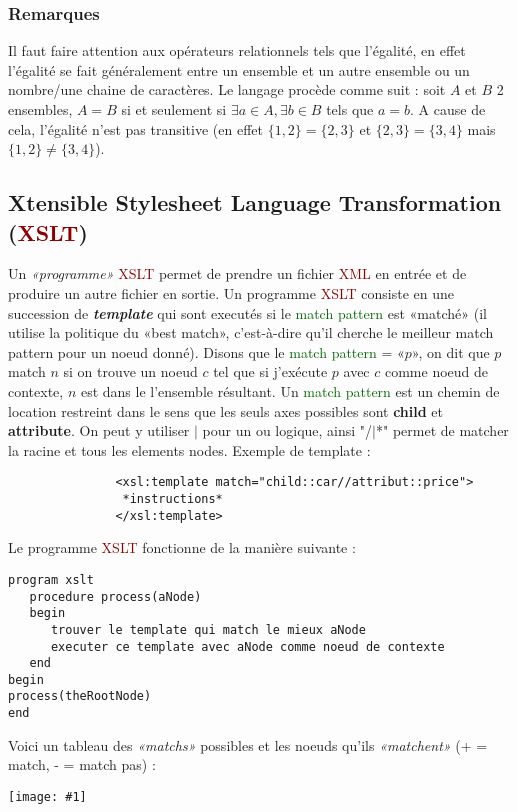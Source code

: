 \documentclass{article}
\newcommand{\gre}[1]{\textcolor{darkgreen}{#1}}
\newcommand{\red}[1]{\textcolor{darkred}{#1}}
\newcommand{\imgR}[2]{\begin{center}\texttt{[image: \#1]}\end{center}}
\begin{document}
\subsubsection{Remarques}

Il faut faire attention aux opérateurs relationnels tels que l'égalité, en effet l'égalité se fait généralement entre un ensemble et un autre ensemble ou un nombre/une chaine de 
caractères. Le langage procède comme suit : soit $A$ et $B$ 2 ensembles, $A = B$ si et seulement si $\exists a \in A, \exists b \in B$ tels que $a = b$. A cause de cela, 
l'égalité n'est pas transitive (en effet $\{1,2\} = \{2,3\}$ et $\{2,3\} = \{3,4\}$ mais $\{1,2\} \not = \{3,4\}$).

\subsection{Xtensible Stylesheet Language Transformation (\red{XSLT})}

Un \textit{«programme»} \red{XSLT} permet de prendre un fichier \red{XML} en entrée et de produire un autre fichier en sortie. Un programme \red{XSLT} consiste en une 
succession de \textit{\textbf{template}} qui sont executés si le \gre{match pattern} est «matché» (il utilise la politique du «best match», c'est-à-dire qu'il cherche le meilleur 
match pattern pour un noeud donné). Disons que le \gre{match pattern} = «$p$», on dit que $p$ match $n$ si on trouve un noeud $c$ tel que si j'exécute $p$ avec $c$ comme 
noeud de contexte, $n$ est dans le l'ensemble résultant. Un \gre{match pattern}  est un chemin de location restreint dans le sens  que les seuls axes possibles sont 
\textbf{child} et \textbf{attribute}. On peut y utiliser $|$ pour un ou logique, ainsi "/$|$*" permet de matcher la racine et tous les elements nodes. Exemple de template :
\begin{verbatim}
               <xsl:template match="child::car//attribut::price">
                *instructions*
               </xsl:template>
\end{verbatim}

\noindent Le programme \red{XSLT} fonctionne de la manière suivante :
\begin{verbatim}
program xslt
   procedure process(aNode)
   begin
      trouver le template qui match le mieux aNode
      executer ce template avec aNode comme noeud de contexte
   end
begin
process(theRootNode)
end
\end{verbatim}

Voici un tableau des \textit{«matchs»} possibles et les noeuds qu'ils \textit{«matchent»} (+ = match, - = match pas) :
\imgR{CAPT_003.png}{400}
\end{document}
